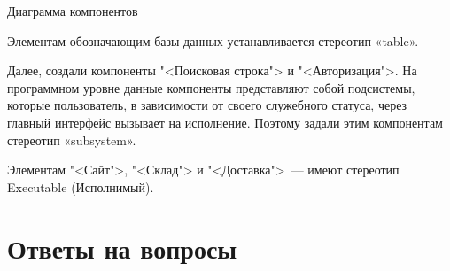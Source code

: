 \begin{image}
	\caption{Диаграмма компонентов}
	\label{fig:components}
\end{image}

Элементам обозначающим базы данных устанавливается стереотип «table».\par
Далее, создали компоненты "<Поисковая строка"> и "<Авторизация">.
На программном уровне данные компоненты представляют собой
подсистемы, которые пользователь, в зависимости от своего служебного статуса,
через главный интерфейс вызывает на исполнение. Поэтому задали
этим компонентам стереотип «subsystem».\par
Элементам "<Сайт">, "<Склад"> и "<Доставка">~--- 
имеют стереотип Executable (Исполнимый).

\clearpage

\section*{Ответы на вопросы}

